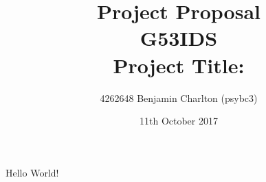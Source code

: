 \documentclass{article}
\title{
    Project Proposal
    \\ \normalsize{G53IDS}
    \\ \normalsize{Project Title: }}
\author{4262648 Benjamin Charlton (psybc3)}
\date{11th October 2017}
\begin{document}
\maketitle
Hello World!
\end{document}
